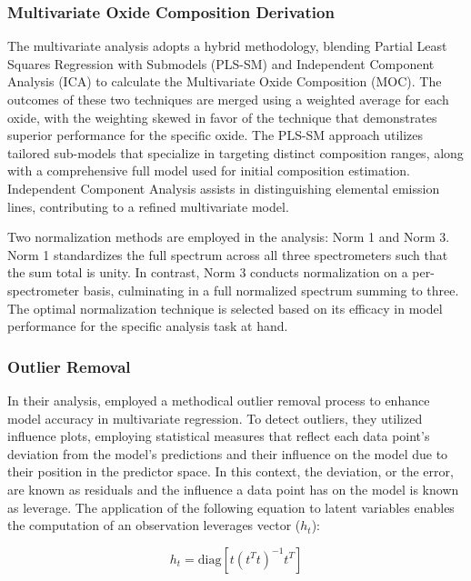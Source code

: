 \subsubsection{Multivariate Oxide Composition Derivation}\label{sec:moc_derivation}
The multivariate analysis adopts a hybrid methodology, blending Partial Least Squares Regression with Submodels (PLS-SM) and Independent Component Analysis (ICA) to calculate the Multivariate Oxide Composition (MOC).
The outcomes of these two techniques are merged using a weighted average for each oxide, with the weighting skewed in favor of the technique that demonstrates superior performance for the specific oxide.
The PLS-SM approach utilizes tailored sub-models that specialize in targeting distinct composition ranges, along with a comprehensive full model used for initial composition estimation.
Independent Component Analysis assists in distinguishing elemental emission lines, contributing to a refined multivariate model.

Two normalization methods are employed in the analysis: Norm 1 and Norm 3.
Norm 1 standardizes the full spectrum across all three spectrometers such that the sum total is unity.
In contrast, Norm 3 conducts normalization on a per-spectrometer basis, culminating in a full normalized spectrum summing to three.
The optimal normalization technique is selected based on its efficacy in model performance for the specific analysis task at hand.

\subsubsection{Outlier Removal}\label{sec:outlier_removal}

In their analysis, \citet{andersonImprovedAccuracyQuantitative2017} employed a methodical outlier removal process to enhance model accuracy in multivariate regression. To detect outliers, they utilized influence plots, employing statistical measures that reflect each data point's deviation from the model's predictions and their influence on the model due to their position in the predictor space.
In this context, the deviation, or the error, are known as residuals and the influence a data point has on the model is known as leverage.
The application of the following equation to latent variables enables the computation of an observation leverages vector (\(h_t\)):

\begin{equation}
    h_t = \text{diag}\left[ t(t^T t)^{-1} t^T \right]
\end{equation}

